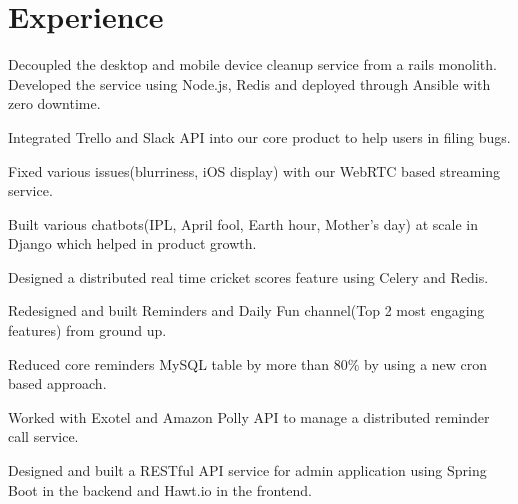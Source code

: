 \documentclass[]{deedy-resume-openfont}
\begin{document}
\begin{minipage}[t]{0.66\textwidth}


\section{Experience}

\vspace{\topsep}
\begin{tightemize}
\item Decoupled the desktop and mobile device cleanup service from a rails monolith. Developed the service using Node.js, Redis and deployed through Ansible with zero downtime.
\item Integrated Trello and Slack API into our core product to help users in filing bugs.
\item Fixed various issues(blurriness, iOS display) with our WebRTC based streaming service. 
\end{tightemize}
\sectionsep

\begin{tightemize}
\item Built various chatbots(IPL, April fool, Earth hour, Mother's day) at scale in Django which helped in product growth.
\item Designed a distributed real time cricket scores feature using Celery and Redis.
\item Redesigned and built Reminders and Daily Fun channel(Top 2 most engaging features) from ground up.
\item Reduced core reminders MySQL table by more than 80\% by using a new cron based approach.
\item Worked with Exotel and Amazon Polly API to manage a distributed reminder call service.
\end{tightemize}
\sectionsep

\begin{tightemize}
\item Designed and built a RESTful API service for admin application using Spring Boot in the backend and Hawt.io in the frontend.
\end{tightemize}
\sectionsep


\end{minipage}
\end{document}
